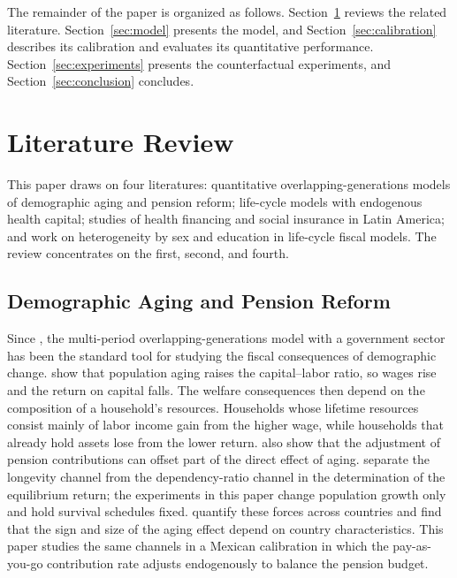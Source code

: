 \documentclass[12pt,a4paper]{article}
\begin{document}
The remainder of the paper is organized as follows. Section~\ref{sec:lit} reviews the related literature. Section~\ref{sec:model} presents the model, and Section~\ref{sec:calibration} describes its calibration and evaluates its quantitative performance. Section~\ref{sec:experiments} presents the counterfactual experiments, and Section~\ref{sec:conclusion} concludes.


\section{Literature Review}
\label{sec:lit}

This paper draws on four literatures: quantitative overlapping-generations models of demographic aging and pension reform; life-cycle models with endogenous health capital; studies of health financing and social insurance in Latin America; and work on heterogeneity by sex and education in life-cycle fiscal models. The review concentrates on the first, second, and fourth.

\subsection{Demographic Aging and Pension Reform}
\label{subsec:lit_pension}

Since \citet{AuerbachKotlikoff1987}, the multi-period overlapping-generations model with a government sector has been the standard tool for studying the fiscal consequences of demographic change. \citet{KruegerLudwig2007} show that population aging raises the capital--labor ratio, so wages rise and the return on capital falls. The welfare consequences then depend on the composition of a household's resources. Households whose lifetime resources consist mainly of labor income gain from the higher wage, while households that already hold assets lose from the lower return. \citet{KruegerLudwig2007} also show that the adjustment of pension contributions can offset part of the direct effect of aging. \citet{CarvalhoFerreroNechio2016} separate the longevity channel from the dependency-ratio channel in the determination of the equilibrium return; the experiments in this paper change population growth only and hold survival schedules fixed. \citet{AuclertEtAl2021} quantify these forces across countries and find that the sign and size of the aging effect depend on country characteristics. This paper studies the same channels in a Mexican calibration in which the pay-as-you-go contribution rate adjusts endogenously to balance the pension budget.
\end{document}
